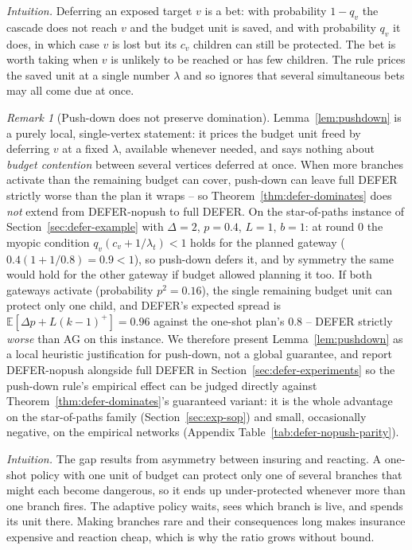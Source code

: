 \documentclass[preprint,11pt]{elsarticle}
\theoremstyle{definition}
\theoremstyle{remark}
\newtheorem{remark}{Remark}
\begin{document}
\emph{Intuition.} Deferring an exposed target $v$ is a bet: with
probability $1-q_v$ the cascade does not reach $v$ and the budget unit is
saved, and with probability $q_v$ it does, in which case $v$ is lost but its
$c_v$ children can still be protected. The bet is worth taking when $v$ is
unlikely to be reached or has few children. The rule prices the saved unit
at a single number $\lambda$ and so ignores that several simultaneous bets
may all come due at once.

\begin{remark}[Push-down does not preserve
domination]\label{rem:pushdown-counterexample}
Lemma~\ref{lem:pushdown} is a purely local, single-vertex statement: it
prices the budget unit freed by deferring $v$ at a fixed $\lambda$,
available whenever needed, and says nothing about \emph{budget contention}
between several vertices deferred at once. When more branches activate
than the remaining budget can cover, push-down can leave full DEFER
strictly worse than the plan it wraps -- so Theorem~\ref{thm:defer-dominates}
does \emph{not} extend from DEFER-nopush to full DEFER. On the
star-of-paths instance of Section~\ref{sec:defer-example} with $\Delta=2$,
$p=0.4$, $L=1$, $b=1$: at round $0$ the myopic condition
$q_v(c_v+1/\lambda_t)<1$ holds for the planned gateway
($0.4(1+1/0.8)=0.9<1$), so push-down defers it, and by symmetry the same
would hold for the other gateway if budget allowed planning it too. If
both gateways activate (probability $p^2=0.16$), the single remaining
budget unit can protect only one child, and DEFER's expected spread is
$\mathbb E[\Delta p+L(k-1)^+]=0.96$ against the one-shot plan's $0.8$
-- DEFER strictly \emph{worse} than AG on this instance. We
therefore present Lemma~\ref{lem:pushdown} as a local heuristic
justification for push-down, not a global guarantee, and report
DEFER-nopush alongside full DEFER in
Section~\ref{sec:defer-experiments} so the push-down rule's empirical
effect can be judged directly against Theorem~\ref{thm:defer-dominates}'s guaranteed variant: it is the whole advantage on the star-of-paths family (Section~\ref{sec:exp-sop}) and small, occasionally negative, on the empirical networks (Appendix Table~\ref{tab:defer-nopush-parity}).
\end{remark}

\emph{Intuition.} The gap results from asymmetry between insuring and
reacting. A one-shot policy with one unit of budget can protect only one of
several branches that might each become dangerous, so it ends up
under-protected whenever more than one branch fires. The adaptive policy waits,
sees which branch is live, and spends its unit there. Making branches rare
and their consequences long makes insurance expensive and reaction cheap,
which is why the ratio grows without bound.
\end{document}
